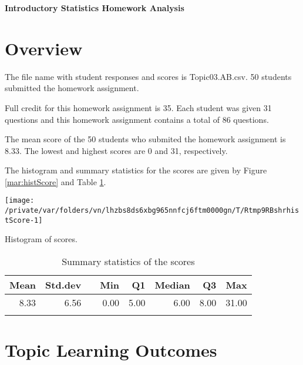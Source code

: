 \documentclass[12pt,english,nohyper]{tufte-handout}\usepackage[]{graphicx}\usepackage[]{color}
\newenvironment{knitrout}{}{} %
\begin{document}
\setcaptionfont{
  \normalfont\footnotesize
  \color{black}
}





\centerline{\Large\bf Introductory Statistics Homework Analysis}


\section{Overview}
The file name with student responses and scores is Topic03.AB.csv. 50 students submitted the homework assignment.

Full credit for this homework assignment is 35. Each student was given 31 questions and this homework assignment contains a total of 86 questions.  

The mean score of the 50 students who submited the homework assignment is 8.33. The lowest and highest scores are 0 and 31, respectively.

The histogram and summary statistics for the scores are given by Figure \ref{mar:histScore} and Table \ref{tab:summary}.

\begin{knitrout}
\color{fgcolor}\begin{marginfigure}
\texttt{[image: /private/var/folders/vn/lhzbs8ds6xbg965nnfcj6ftm0000gn/T/Rtmp9RBshrhistScore-1]} \caption[Histogram of scores]{Histogram of scores.}\label{mar:histScore}
\end{marginfigure}


\end{knitrout}

\begin{longtable}{rrlrrrrr}
  \hline
Mean & Std.dev &   & Min & Q1 & Median & Q3 & Max \\ 
  \hline
8.33 & 6.56 &  & 0.00 & 5.00 & 6.00 & 8.00 & 31.00 \\ 
   \hline
\hline
\caption{Summary statistics of the scores} 
\label{tab:summary}
\end{longtable}


\clearpage
\newpage{}
\section{Topic Learning Outcomes}

\bigskip{}
\end{document}
